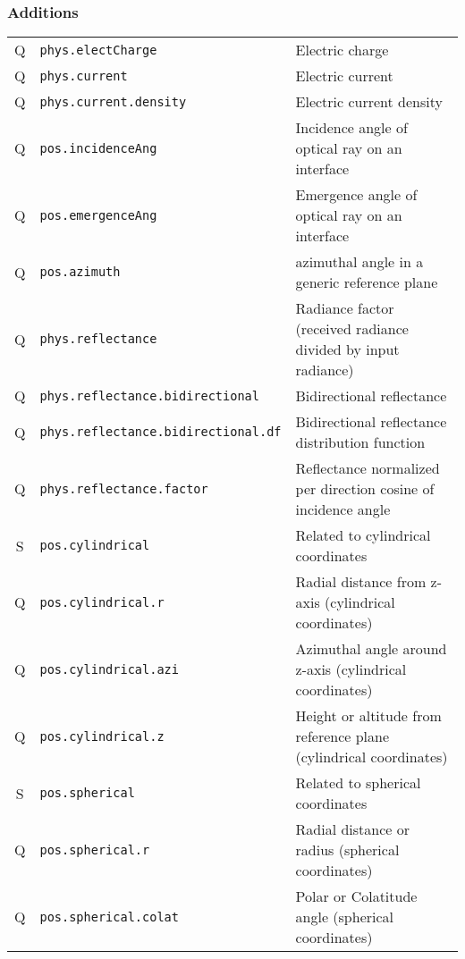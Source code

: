 \documentclass[11pt,a4paper]{ivoa}
\begin{document}
\subsubsection*{Additions}
\footnotesize\begin{longtable}[h!]{c|p{39.5ex}|D{0.45\textwidth}}
\sptablerule
Q & {\tt phys.electCharge} & Electric charge\\
Q & {\tt phys.current} & Electric current\\
Q & {\tt phys.current.density} & Electric current density\\
Q & {\tt pos.incidenceAng} & Incidence angle of optical ray on an interface\\
Q & {\tt pos.emergenceAng} & Emergence angle of optical ray on an interface\\
Q & {\tt pos.azimuth} & azimuthal angle in a generic reference plane\\
Q & {\tt phys.reflectance} & Radiance factor (received radiance divided by input radiance)\\
Q & {\tt phys.reflectance.bidirectional} & Bidirectional reflectance\\
Q & {\tt phys.reflectance.bidirectional.df} & Bidirectional reflectance distribution function\\
Q & {\tt phys.reflectance.factor} & Reflectance normalized per direction cosine of incidence angle\\
S & {\tt pos.cylindrical} & Related to cylindrical coordinates\\
Q & {\tt pos.cylindrical.r} & Radial distance from z-axis (cylindrical coordinates)\\
Q & {\tt pos.cylindrical.azi} & Azimuthal angle around z-axis (cylindrical coordinates)\\
Q & {\tt pos.cylindrical.z} & Height or altitude from reference plane (cylindrical coordinates)\\
S & {\tt pos.spherical} & Related to spherical coordinates\\
Q & {\tt pos.spherical.r} & Radial distance or radius (spherical coordinates)\\
Q & {\tt pos.spherical.colat} & Polar or Colatitude angle (spherical coordinates)\\

\end{longtable}
\end{document}
